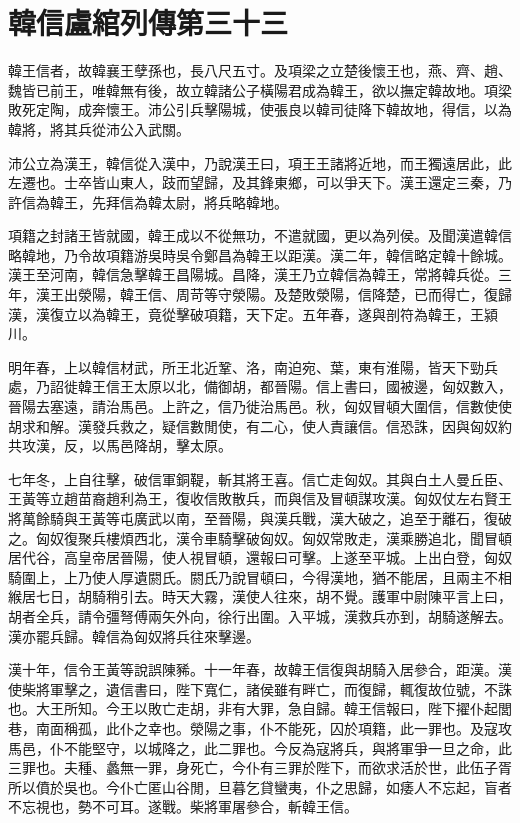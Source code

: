 \chapter{韓信盧綰列傳第三十三}

韓王信者，故韓襄王孽孫也，長八尺五寸。及項梁之立楚後懷王也，燕、齊、趙、魏皆已前王，唯韓無有後，故立韓諸公子橫陽君成為韓王，欲以撫定韓故地。項梁敗死定陶，成奔懷王。沛公引兵擊陽城，使張良以韓司徒降下韓故地，得信，以為韓將，將其兵從沛公入武關。

沛公立為漢王，韓信從入漢中，乃說漢王曰，項王王諸將近地，而王獨遠居此，此左遷也。士卒皆山東人，跂而望歸，及其鋒東鄉，可以爭天下。漢王還定三秦，乃許信為韓王，先拜信為韓太尉，將兵略韓地。

項籍之封諸王皆就國，韓王成以不從無功，不遣就國，更以為列侯。及聞漢遣韓信略韓地，乃令故項籍游吳時吳令鄭昌為韓王以距漢。漢二年，韓信略定韓十餘城。漢王至河南，韓信急擊韓王昌陽城。昌降，漢王乃立韓信為韓王，常將韓兵從。三年，漢王出滎陽，韓王信、周苛等守滎陽。及楚敗滎陽，信降楚，已而得亡，復歸漢，漢復立以為韓王，竟從擊破項籍，天下定。五年春，遂與剖符為韓王，王潁川。

明年春，上以韓信材武，所王北近鞏、洛，南迫宛、葉，東有淮陽，皆天下勁兵處，乃詔徙韓王信王太原以北，備御胡，都晉陽。信上書曰，國被邊，匈奴數入，晉陽去塞遠，請治馬邑。上許之，信乃徙治馬邑。秋，匈奴冒頓大圍信，信數使使胡求和解。漢發兵救之，疑信數閒使，有二心，使人責讓信。信恐誅，因與匈奴約共攻漢，反，以馬邑降胡，擊太原。

七年冬，上自往擊，破信軍銅鞮，斬其將王喜。信亡走匈奴。其與白土人曼丘臣、王黃等立趙苗裔趙利為王，復收信敗散兵，而與信及冒頓謀攻漢。匈奴仗左右賢王將萬餘騎與王黃等屯廣武以南，至晉陽，與漢兵戰，漢大破之，追至于離石，復破之。匈奴復聚兵樓煩西北，漢令車騎擊破匈奴。匈奴常敗走，漢乘勝追北，聞冒頓居代谷，高皇帝居晉陽，使人視冒頓，還報曰可擊。上遂至平城。上出白登，匈奴騎圍上，上乃使人厚遺閼氏。閼氏乃說冒頓曰，今得漢地，猶不能居，且兩主不相緱居七日，胡騎稍引去。時天大霧，漢使人往來，胡不覺。護軍中尉陳平言上曰，胡者全兵，請令彊弩傅兩矢外向，徐行出圍。入平城，漢救兵亦到，胡騎遂解去。漢亦罷兵歸。韓信為匈奴將兵往來擊邊。

漢十年，信令王黃等說誤陳豨。十一年春，故韓王信復與胡騎入居參合，距漢。漢使柴將軍擊之，遺信書曰，陛下寬仁，諸侯雖有畔亡，而復歸，輒復故位號，不誅也。大王所知。今王以敗亡走胡，非有大罪，急自歸。韓王信報曰，陛下擢仆起閭巷，南面稱孤，此仆之幸也。滎陽之事，仆不能死，囚於項籍，此一罪也。及寇攻馬邑，仆不能堅守，以城降之，此二罪也。今反為寇將兵，與將軍爭一旦之命，此三罪也。夫種、蠡無一罪，身死亡，今仆有三罪於陛下，而欲求活於世，此伍子胥所以僨於吳也。今仆亡匿山谷閒，旦暮乞貸蠻夷，仆之思歸，如痿人不忘起，盲者不忘視也，勢不可耳。遂戰。柴將軍屠參合，斬韓王信。

